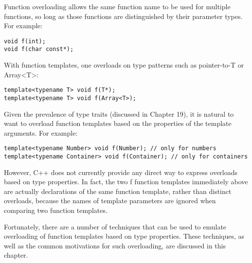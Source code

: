 
Function overloading allows the same function name to be used for multiple functions, so long as those functions are distinguished by their parameter types. For example:

\begin{lstlisting}[style=styleCXX]
void f(int);
void f(char const*);
\end{lstlisting}

With function templates, one overloads on type patterns such as pointer-to-T or Array<T>:

\begin{lstlisting}[style=styleCXX]
template<typename T> void f(T*);
template<typename T> void f(Array<T>);
\end{lstlisting}

Given the prevalence of type traits (discussed in Chapter 19), it is natural to want to overload function templates based on the properties of the template arguments. For example:

\begin{lstlisting}[style=styleCXX]
template<typename Number> void f(Number); // only for numbers
template<typename Container> void f(Container); // only for containers
\end{lstlisting}

However, C++ does not currently provide any direct way to express overloads based on type properties. In fact, the two f function templates immediately above are actually declarations of the same function template, rather than distinct overloads, because the names of template parameters are ignored when comparing two function templates.

Fortunately, there are a number of techniques that can be used to emulate overloading of function templates based on type properties. These techniques, as well as the common motivations for such overloading, are discussed in this chapter.






























